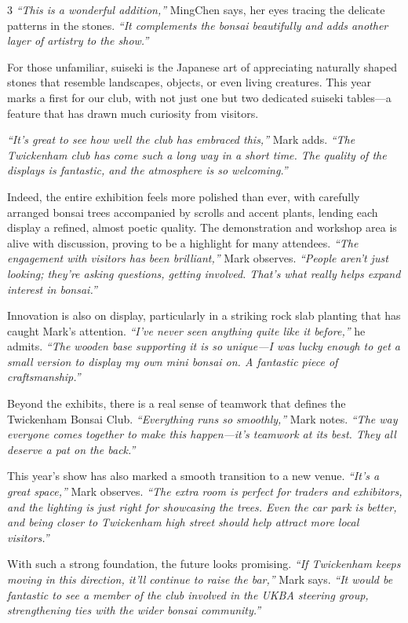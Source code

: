\begin{multicols}{3}
\textit{``This is a wonderful addition,''} MingChen says, her eyes tracing the delicate patterns in the stones. \textit{``It complements the bonsai beautifully and adds another layer of artistry to the show.''}  

For those unfamiliar, suiseki is the Japanese art of appreciating naturally shaped stones that resemble landscapes, objects, or even living creatures. 
This year marks a first for our club, with not just one but two dedicated suiseki tables---a feature that has drawn much curiosity from visitors. 

\textit{``It's great to see how well the club has embraced this,''} Mark adds. \textit{``The Twickenham club has come such a long way in a short time. The quality of the displays is fantastic, and the atmosphere is so welcoming.''} 

Indeed, the entire exhibition feels more polished than ever, with carefully arranged bonsai trees accompanied by scrolls and accent plants, lending each display a refined, almost poetic quality. 
The demonstration and workshop area is alive with discussion, proving to be a highlight for many attendees. \textit{``The engagement with visitors has been brilliant,''} Mark observes. \textit{``People aren't just looking; they're asking questions, getting involved. That's what really helps expand interest in bonsai.''} 

Innovation is also on display, particularly in a striking rock slab planting that has caught Mark's attention. \textit{``I've never seen anything quite like it before,''} he admits. \textit{``The wooden base supporting it is so unique---I was lucky enough to get a small version to display my own mini bonsai on. A fantastic piece of craftsmanship.''} 

Beyond the exhibits, there is a real sense of teamwork that defines the Twickenham Bonsai Club. \textit{``Everything runs so smoothly,''} Mark notes. \textit{``The way everyone comes together to make this happen---it's teamwork at its best. They all deserve a pat on the back.''}  

This year's show has also marked a smooth transition to a new venue. \textit{``It's a great space,''} Mark observes. \textit{``The extra room is perfect for traders and exhibitors, and the lighting is just right for showcasing the trees. Even the car park is better, and being closer to Twickenham high street should help attract more local visitors.''} 

With such a strong foundation, the future looks promising. \textit{``If Twickenham keeps moving in this direction, it'll continue to raise the bar,''} Mark says. \textit{``It would be fantastic to see a member of the club involved in the UKBA steering group, strengthening ties with the wider bonsai community.''} 


\end{multicols}
